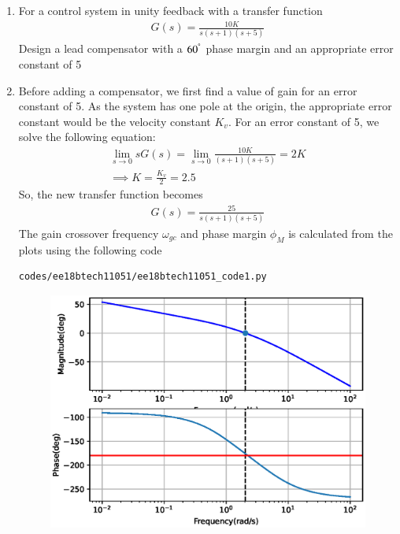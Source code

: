 \begin{enumerate}[label=\thesection.\arabic*.,ref=\thesection.\theenumi]

\item

For a control system in unity feedback with a transfer function
\begin{align}
    G(s) = \frac{10K}{s(s+1)(s+5)}
\end{align}
Design a lead compensator with a $60^{\degree}$ phase margin and an appropriate error constant of 5

\item
\solution
Before adding a compensator, we first find a value of gain for an error constant of 5. As the system has one pole at the origin, the appropriate error constant would be the velocity constant $K_{v}$. For an error constant of 5, we solve the following equation:
\begin{align}
    \lim_{s \to 0} s G(s) = \lim_{s \to 0} \frac{10K}{(s+1)(s+5)} = 2K\\
    \implies K = \frac{K_{v}}{2} = 2.5
\end{align}
So, the new transfer function becomes
\begin{align}
    G(s) = \frac{25}{s(s+1)(s+5)}
\end{align}
The gain crossover frequency $ \omega_{gc} $ and phase margin $ \phi_{M} $ is calculated from the plots using the following code
\begin{lstlisting}
codes/ee18btech11051/ee18btech11051_code1.py
\end{lstlisting}

\begin{figure}[!h]
    \centering
    \includegraphics[width=\columnwidth]{./figs/ee18btech11051/ee18btech11051_fig1.eps}
    \label{fig:ee18btech11051_1}
\end{figure}


\end{enumerate}
